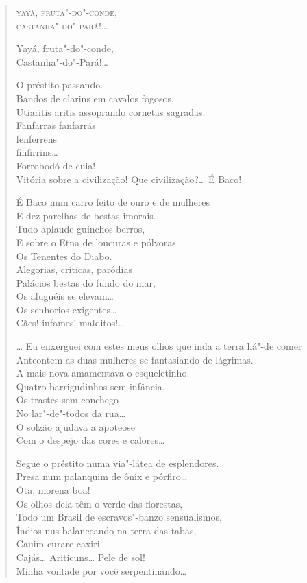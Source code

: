 \begin{verse}
\quad\quad\quad\quad\quad{}\textsc{yayá, fruta"-do"-conde},\\
\quad\quad\quad\quad\quad{}\textsc{castanha"-do"-pará!}\ldots{}

\quad\quad\quad\quad\quad\quad\quad{}Yayá, fruta"-do"-conde,\\
\quad\quad\quad\quad\quad\quad\quad{}Castanha"-do"-Pará!\ldots{}

O préstito passando.\\
Bandos de clarins em cavalos fogosos.\\
Utiaritis aritis assoprando cornetas sagradas.\\
Fanfarras fanfarrãs\\
\qquad\qquad\qquad{}fenferrens\\
\qquad\qquad\qquad\qquad{}finfirrins\ldots{}\\
\qquad\qquad\qquad\qquad\qquad{}Forrobodó de cuia!\\
Vitória sobre a civilização! Que civilização?\ldots{} É Baco!

É Baco num carro feito de ouro e de mulheres\\
E dez parelhas de bestas imorais.\\
Tudo aplaude guinchos berros,\\
E sobre o Etna de loucuras e pólvoras\\
Os Tenentes do Diabo.\\
Alegorias, críticas, paródias\\
Palácios bestas do fundo do mar,\\
Os aluguéis se elevam\ldots{}\\
\quad{}Os senhorios exigentes\ldots{}\\
\quad\quad{}Cães! infames! malditos!\ldots{}

\ldots{} Eu enxerguei com estes meus olhos que inda a terra há"-de comer\\
Anteontem as duas mulheres se fantasiando de lágrimas.\\
A mais nova amamentava o esqueletinho.\\
Quatro barrigudinhos sem infância,\\
Os trastes sem conchego\\
No lar"-de"-todos da rua\ldots{}\\
O solzão ajudava a apoteose\\
Com o despejo das cores e calores\ldots{}

Segue o préstito numa via"-látea de esplendores.\\
Presa num palanquim de ônix e pórfiro\ldots{}\\
Ôta, morena boa!\\
Os olhos dela têm o verde das florestas,\\
Todo um Brasil de escravos"-banzo sensualismos,\\
Índios nus balanceando na terra das tabas,\\
Cauim curare caxiri\\
Cajás\ldots{} Ariticuns\ldots{} Pele de sol!\\
Minha vontade por você serpentinando\ldots{}


\end{verse}
